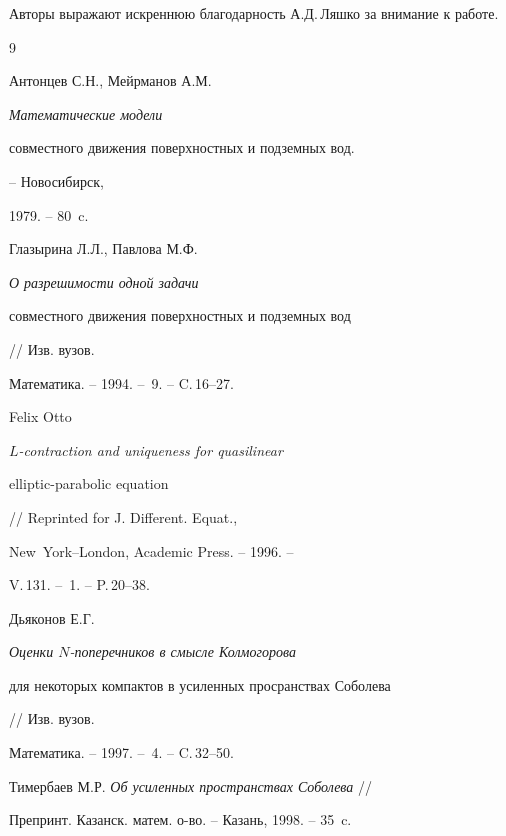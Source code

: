  


Авторы выражают искреннюю благодарность А.Д.\,Ляшко за внимание к работе.





\begin{thebibliography}{9} 







Антонцев С.Н., Мейрманов А.М. {\em Математические модели


совместного движения поверхностных и подземных вод.} -- Новосибирск,


1979. -- 80~c.




Глазырина Л.Л., Павлова М.Ф. {\em О разрешимости одной задачи


совместного движения поверхностных и подземных вод} // Изв. вузов.


Математика. -- 1994. -- \No\,9. -- C.\,16--27.




Felix Otto {\em $L$-contraction and uniqueness for quasilinear


elliptic-parabolic equation} // Reprinted for J. Different. Equat.,


New~York--London, Academic Press. -- 1996. --


V.\,131. -- \No\,1. -- P.\,20--38.




Дьяконов Е.Г. {\em Оценки $N$-поперечников в смысле Колмогорова


для некоторых компактов в усиленных просранствах Соболева} // Изв. вузов.


Математика. -- 1997. -- \No\,4. -- C.\,32--50.




Тимербаев М.Р. {\em Об усиленных пространствах Соболева} //


Препринт. Казанск. матем. о-во. -- Казань, 1998. -- 35~c.





\end{thebibliography}





\vskip 2cm












\label{end}






